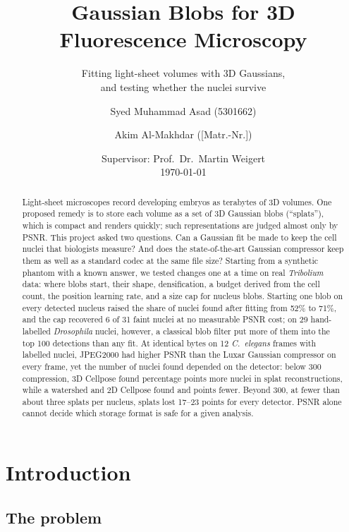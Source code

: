 \documentclass[
  paper=a4,
  fontsize=11pt,
  english,
  numbers=noenddot,
  parskip=half,
  cdgeometry=symmetric,
  cd=barcolor,
  cdfont=false
]{tudscrartcl}
\institute{}
\title{Gaussian Blobs for 3D Fluorescence Microscopy}
\subtitle{Fitting light-sheet volumes with 3D Gaussians,\\and testing whether the nuclei survive}
\author{Syed Muhammad Asad (5301662)\and Akim Al-Makhdar ([Matr.-Nr.])}
\date{Supervisor: Prof.\ Dr.\ Martin Weigert\\[0.5ex]\today}
\begin{document}
\maketitle

\begin{abstract}
\noindent Light-sheet microscopes record developing embryos as terabytes of 3D volumes. One
proposed remedy is to store each volume as a set of 3D Gaussian blobs (``splats''), which is
compact and renders quickly; such representations are judged almost only by PSNR. This
project asked two questions. Can a Gaussian fit be made to keep the cell nuclei that
biologists measure? And does the state-of-the-art Gaussian compressor keep them as well as a
standard codec at the same file size? Starting from a synthetic phantom with a known answer,
we tested changes one at a time on real \emph{Tribolium} data: where blobs start, their shape,
densification, a budget derived from the cell count, the position learning rate, and a size
cap for nucleus blobs. Starting one blob on every detected nucleus raised the share of nuclei
found after fitting from 52\% to 71\%, and the cap recovered 6 of 31 faint nuclei at no
measurable PSNR cost; on 29 hand-labelled \emph{Drosophila} nuclei, however, a classical blob
filter put more of them into the top 100 detections than any fit. At identical bytes on 12 \emph{C.~elegans} frames with
\NlabTotal{} labelled nuclei, JPEG2000 had higher PSNR than the Luxar Gaussian compressor on
every frame, yet the number of nuclei found depended on the detector: below
\SI{300}{\times} compression, 3D Cellpose found \FrModCPthree{} percentage points more nuclei
in splat reconstructions, while a watershed and 2D Cellpose found \FrModWS{} and \FrModCP{}
points fewer. Beyond \SI{300}{\times}, at fewer than about three splats per nucleus, splats
lost 17--23 points for every detector. PSNR alone cannot decide which storage format is safe for
a given analysis.
\end{abstract}

\clearpage
\tableofcontents
\clearpage

\section{Introduction}\label{sec:intro}

\subsection{The problem}
\end{document}
